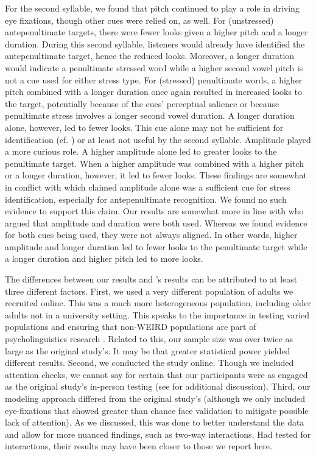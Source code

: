 For the second syllable, we found that pitch continued to play a role in driving eye fixations, though other cues were relied on, as well. For (unstressed) antepenultimate targets, there were fewer looks given a higher pitch and a longer duration. During this second syllable, listeners would already have identified the antepenultimate target, hence the reduced looks. Moreover, a longer duration would indicate a penultimate stressed word while a higher second vowel pitch is not a cue used for either stress type. For (stressed) penultimate words, a higher pitch combined with a longer duration once again resulted in increased looks to the target, potentially because of the cues' perceptual salience \citep{ip2022search, wright2009review, beckman_1994} or because penultimate stress involves a longer second vowel duration. A longer duration alone, however, led to fewer looks. This cue alone may not be sufficient for identification (cf. \cite{Alfano2006, Alfano2009}) or at least not useful by the second syllable. Amplitude played a more curious role. A higher amplitude alone led to greater looks to the penultimate target. When a higher amplitude was combined with a higher pitch or a longer duration, however, it led to fewer looks. These findings are somewhat in conflict with \cite{Sulpizio_McQueen_2012} which claimed amplitude alone was a sufficient cue for stress identification, especially for antepenultimate recognition. We found no such evidence to support this claim. Our results are somewhat more in line with \cite{Tagliapietra2005} who argued that amplitude and duration were both used. Whereas we found evidence for both cues being used, they were not always aligned. In other words, higher amplitude and longer duration led to fewer looks to the penultimate target while a longer duration and higher pitch led to more looks. 

The differences between our results and \cite{Sulpizio_McQueen_2012}'s results can be attributed to at least three different factors. First, we used a very different population of adults we recruited online. This was a much more heterogeneous population, including older adults not in a university setting. This speaks to the importance in testing varied populations and ensuring that non-WEIRD populations are part of psycholinguistics research \citep{frost2021investigating}. Related to this, our sample size was over twice as large as the original study's. It may be that greater statistical power yielded different results. Second, we conducted the study online. Though we included attention checks, we cannot say for certain that our participants were as engaged as the original study's in-person testing (see \cite{rodd2024moving} for additional discussion). Third, our modeling approach differed from the original study's (although we only included eye-fixations that showed greater than chance face validation to mitigate possible lack of attention). As we discussed, this was done to better understand the data and allow for more nuanced findings, such as two-way interactions. Had \cite{Sulpizio_McQueen_2012} tested for interactions, their results may have been closer to those we report here.

